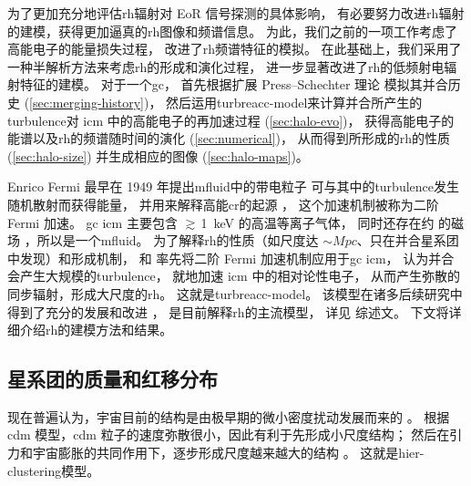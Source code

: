 为了更加充分地评估\ac{rh}辐射对 EoR 信号探测的具体影响，
有必要努力改进\ac{rh}辐射的建模，获得更加逼真的\ac{rh}图像和频谱信息。
为此，我们之前的一项工作\cite{wang2010}考虑了高能电子的能量损失过程，
改进了\ac{rh}频谱特征的模拟。
在此基础上，我们采用了一种半解析方法来考虑\ac{rh}的形成和演化过程，
进一步显著改进了\ac{rh}的低频射电辐射特征的建模。
对于一个\ac{gc}，
首先根据扩展 Press--Schechter 理论
模拟其并合历史 (\autoref{sec:merging-history})，
然后运用\ac{turbreacc-model}来计算并合所产生的\ac{turbulence}对
\ac{icm} 中的高能电子的再加速过程 (\autoref{sec:halo-evo})，
获得高能电子的能谱以及\ac{rh}的频谱随时间的演化 (\autoref{sec:numerical})，
从而得到所形成的\ac{rh}的性质 (\autoref{sec:halo-size})
并生成相应的图像 (\autoref{sec:halo-maps})。

Enrico Fermi 最早在 1949 年提出\ac{mfluid}中的带电粒子
可与其中的\ac{turbulence}发生随机散射而获得能量，
并用来解释高能\ac{cr}的起源 \cite{fermi1949,fermi1954,davis1956}，
这个加速机制被称为二阶 Fermi 加速。
\ac{gc} \ac{icm} 主要包含 $\gtrsim$\,\SI{1}{\keV} 的高温等离子气体，
同时还存在约 \si{\uG} 的磁场 \cite{govoni2004,ryu2008}，所以是一个\ac{mfluid}。
为了解释\ac{rh}的性质（如尺度达 $\sim\si{Mpc}$、只在并合星系团中发现）和形成机制，
 和 
率先将二阶 Fermi 加速机制应用于\ac{gc} \ac{icm}，
认为并合会产生大规模的\ac{turbulence}，
就地加速 \ac{icm} 中的相对论性电子，
从而产生弥散的同步辐射，形成大尺度的\ac{rh}。
这就是\ac{turbreacc-model}。
该模型在诸多后续研究中得到了充分的发展和改进
\cite{fujita2003,brunetti2004,cassano2005,brunetti2007,brunetti2011}，
是目前解释\ac{rh}的主流模型，
详见  综述文。
下文将详细介绍\ac{rh}的建模方法和结果。

\subsection{星系团的质量和红移分布}
\label{sec:mass-function}

现在普遍认为，宇宙目前的结构是由极早期的微小密度扰动发展而来的 \cite{peebles1980}。
根据\acf{cdm} 模型，\ac{cdm} 粒子的速度弥散很小，因此有利于先形成小尺度结构；
然后在引力和宇宙膨胀的共同作用下，逐步形成尺度越来越大的结构
\cite{davis1985,bond1991,lacey1993}。
这就是\acf{hier-clustering}模型。

